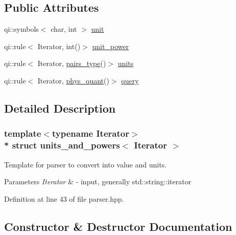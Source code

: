 \subsection*{Public Attributes}
\begin{DoxyCompactItemize}
\item 
qi\+::symbols$<$ char, int $>$ \hyperlink{structunits__and__powers_a1a694d2cf336d0c9f9abe5204ac46319}{unit}
\item 
qi\+::rule$<$ Iterator, int()$>$ \hyperlink{structunits__and__powers_a90d733fe21d7d5efc2a599b0ab6df131}{unit\+\_\+power}
\item 
qi\+::rule$<$ Iterator, \hyperlink{parser_8hpp_ab598806586272ab27a10406c3b8436fe}{pairs\+\_\+type}()$>$ \hyperlink{structunits__and__powers_ab2d482b29c10f220fbbb3bbaf79d63ef}{units}
\item 
qi\+::rule$<$ Iterator, \hyperlink{parser_8hpp_a76d816dc60daad0ab1c3c7b1dc7906d2}{phys\+\_\+quant}()$>$ \hyperlink{structunits__and__powers_a9a88ef937627d35522c4017b9efd59ba}{query}
\end{DoxyCompactItemize}


\subsection{Detailed Description}
\subsubsection*{template$<$typename Iterator$>$\\*
struct units\+\_\+and\+\_\+powers$<$ Iterator $>$}

Template for parser to convert into value and units. 
\begin{DoxyParams}{Parameters}
{\em Iterator} & -\/ input, generally std\+::string\+::iterator \\
\hline
\end{DoxyParams}


Definition at line 43 of file parser.\+hpp.



\subsection{Constructor \& Destructor Documentation}
